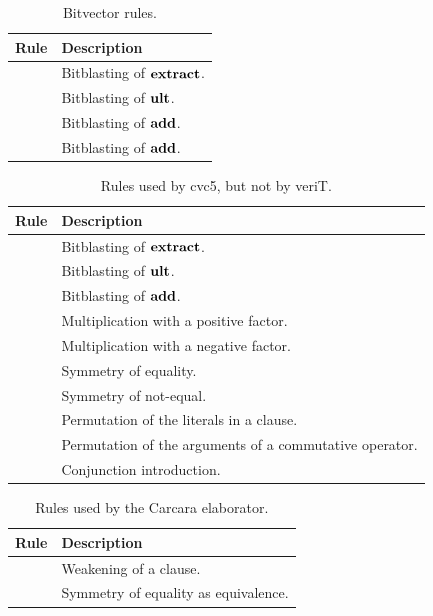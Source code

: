 \begin{xltabular}{\linewidth}{l X}
\caption{Bitvector rules.}
\label{rule-tab:bitblasting}\\
  Rule & Description \\
  \hline
{} & Bitblasting of $\mathbf{extract}$. \\
 & Bitblasting of $\mathbf{ult}$. \\
 & Bitblasting of $\mathbf{add}$. \\
 & Bitblasting of $\mathbf{add}$. \\
\end{xltabular}

\begin{xltabular}{\linewidth}{l X}
\caption{Rules used by cvc5, but not by veriT.}
\label{rule-tab:cvc5}\\
  Rule & Description \\
  \hline
{} & Bitblasting of $\mathbf{extract}$. \\
 & Bitblasting of $\mathbf{ult}$. \\
 & Bitblasting of $\mathbf{add}$. \\
 & Multiplication with a positive factor. \\
 & Multiplication with a negative factor.\\
     & Symmetry of equality. \\
 & Symmetry of not-equal.\\
 & Permutation of the literals in a clause.\\
 & Permutation of the arguments of a commutative operator.\\
 & Conjunction introduction.\\
\end{xltabular}

\begin{xltabular}{\linewidth}{l X}
\caption{Rules used by the Carcara elaborator.}
\label{rule-tab:carcara}\\
  Rule & Description \\
  \hline
{} & Weakening of a clause. \\
 & Symmetry of equality as equivalence. \\
\end{xltabular}

